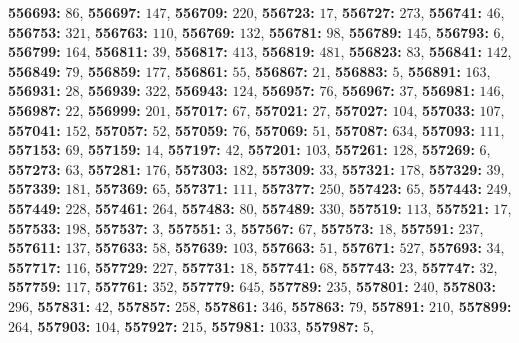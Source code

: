 \textsf{\bfseries 556693:} $86$, \textsf{\bfseries 556697:} $147$, \textsf{\bfseries 556709:} $220$, \textsf{\bfseries 556723:} $17$, \textsf{\bfseries 556727:} $273$, \textsf{\bfseries 556741:} $46$, \textsf{\bfseries 556753:} $321$, \textsf{\bfseries 556763:} $110$, \textsf{\bfseries 556769:} $132$, \textsf{\bfseries 556781:} $98$, \textsf{\bfseries 556789:} $145$, \textsf{\bfseries 556793:} $6$, \textsf{\bfseries 556799:} $164$, \textsf{\bfseries 556811:} $39$, \textsf{\bfseries 556817:} $413$, \textsf{\bfseries 556819:} $481$, \textsf{\bfseries 556823:} $83$, \textsf{\bfseries 556841:} $142$, \textsf{\bfseries 556849:} $79$, \textsf{\bfseries 556859:} $177$, \textsf{\bfseries 556861:} $55$, \textsf{\bfseries 556867:} $21$, \textsf{\bfseries 556883:} $5$, \textsf{\bfseries 556891:} $163$, \textsf{\bfseries 556931:} $28$, \textsf{\bfseries 556939:} $322$, \textsf{\bfseries 556943:} $124$, \textsf{\bfseries 556957:} $76$, \textsf{\bfseries 556967:} $37$, \textsf{\bfseries 556981:} $146$, \textsf{\bfseries 556987:} $22$, \textsf{\bfseries 556999:} $201$, \textsf{\bfseries 557017:} $67$, \textsf{\bfseries 557021:} $27$, \textsf{\bfseries 557027:} $104$, \textsf{\bfseries 557033:} $107$, \textsf{\bfseries 557041:} $152$, \textsf{\bfseries 557057:} $52$, \textsf{\bfseries 557059:} $76$, \textsf{\bfseries 557069:} $51$, \textsf{\bfseries 557087:} $634$, \textsf{\bfseries 557093:} $111$, \textsf{\bfseries 557153:} $69$, \textsf{\bfseries 557159:} $14$, \textsf{\bfseries 557197:} $42$, \textsf{\bfseries 557201:} $103$, \textsf{\bfseries 557261:} $128$, \textsf{\bfseries 557269:} $6$, \textsf{\bfseries 557273:} $63$, \textsf{\bfseries 557281:} $176$, \textsf{\bfseries 557303:} $182$, \textsf{\bfseries 557309:} $33$, \textsf{\bfseries 557321:} $178$, \textsf{\bfseries 557329:} $39$, \textsf{\bfseries 557339:} $181$, \textsf{\bfseries 557369:} $65$, \textsf{\bfseries 557371:} $111$, \textsf{\bfseries 557377:} $250$, \textsf{\bfseries 557423:} $65$, \textsf{\bfseries 557443:} $249$, \textsf{\bfseries 557449:} $228$, \textsf{\bfseries 557461:} $264$, \textsf{\bfseries 557483:} $80$, \textsf{\bfseries 557489:} $330$, \textsf{\bfseries 557519:} $113$, \textsf{\bfseries 557521:} $17$, \textsf{\bfseries 557533:} $198$, \textsf{\bfseries 557537:} $3$, \textsf{\bfseries 557551:} $3$, \textsf{\bfseries 557567:} $67$, \textsf{\bfseries 557573:} $18$, \textsf{\bfseries 557591:} $237$, \textsf{\bfseries 557611:} $137$, \textsf{\bfseries 557633:} $58$, \textsf{\bfseries 557639:} $103$, \textsf{\bfseries 557663:} $51$, \textsf{\bfseries 557671:} $527$, \textsf{\bfseries 557693:} $34$, \textsf{\bfseries 557717:} $116$, \textsf{\bfseries 557729:} $227$, \textsf{\bfseries 557731:} $18$, \textsf{\bfseries 557741:} $68$, \textsf{\bfseries 557743:} $23$, \textsf{\bfseries 557747:} $32$, \textsf{\bfseries 557759:} $117$, \textsf{\bfseries 557761:} $352$, \textsf{\bfseries 557779:} $645$, \textsf{\bfseries 557789:} $235$, \textsf{\bfseries 557801:} $240$, \textsf{\bfseries 557803:} $296$, \textsf{\bfseries 557831:} $42$, \textsf{\bfseries 557857:} $258$, \textsf{\bfseries 557861:} $346$, \textsf{\bfseries 557863:} $79$, \textsf{\bfseries 557891:} $210$, \textsf{\bfseries 557899:} $264$, \textsf{\bfseries 557903:} $104$, \textsf{\bfseries 557927:} $215$, \textsf{\bfseries 557981:} $1033$, \textsf{\bfseries 557987:} $5$, 
